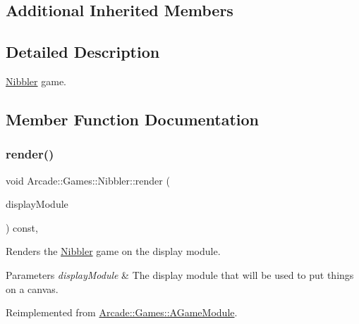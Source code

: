 \subsection*{Additional Inherited Members}


\subsection{Detailed Description}
\mbox{\hyperlink{classArcade_1_1Games_1_1Nibbler}{Nibbler}} game. 

\subsection{Member Function Documentation}
\mbox{\label{classArcade_1_1Games_1_1Nibbler_afd52ee2fad66523b58f94f9eb582145e}} 
\subsubsection{\texorpdfstring{render()}{render()}}
{\footnotesize\ttfamily void Arcade\+::\+Games\+::\+Nibbler\+::render (\begin{DoxyParamCaption}\item[{\mbox{\hyperlink{classArcade_1_1Display_1_1IDisplayModule}{Arcade\+::\+Display\+::\+I\+Display\+Module}} \&}]{display\+Module }\end{DoxyParamCaption}) const\hspace{0.3cm}{\ttfamily [final]}, {\ttfamily [virtual]}}



Renders the \mbox{\hyperlink{classArcade_1_1Games_1_1Nibbler}{Nibbler}} game on the display module. 


\begin{DoxyParams}{Parameters}
{\em display\+Module} & The display module that will be used to put things on a canvas. \\
\hline
\end{DoxyParams}


Reimplemented from \mbox{\hyperlink{classArcade_1_1Games_1_1AGameModule_a5897780d42d5faba3287c29b87f2b498}{Arcade\+::\+Games\+::\+A\+Game\+Module}}.

\mbox{\label{classArcade_1_1Games_1_1Nibbler_a6a44a75ab1905647587d7a6314155955}} 
